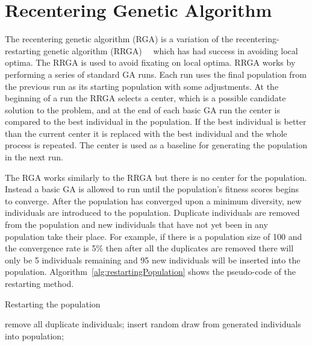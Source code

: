 \section{Recentering Genetic Algorithm}
\label{sec:rga}

The recentering genetic algorithm (RGA) is a variation of the recentering-restarting genetic algorithm (RRGA)~\cite{hughes2013recentering}~\cite{hughes2013edit} which has had success in avoiding local optima. The RRGA is used to avoid fixating on local optima. RRGA works by performing a series of standard GA runs. Each run uses the final population from the previous run as its starting population with some adjustments. At the beginning of a run the RRGA selects a center, which is a possible candidate solution to the problem, and at the end of each basic GA run the center is compared to the best individual in the population. If the best individual is better than the current center it is replaced with the best individual and the whole process is repeated. The center is used as a baseline for generating the population in the next run.

The RGA works similarly to the RRGA but there is no center for the population. Instead a basic GA is allowed to run until the population's fitness scores begins to converge. After the population has converged upon a minimum diversity, new individuals are introduced to the population. Duplicate individuals are removed from the population and new individuals that have not yet been in any population take their place. For example, if there is a population size of 100 and the convergence rate is 5\% then after all the duplicates are removed there will only be 5 individuals remaining and 95 new individuals will be inserted into the population. Algorithm~\ref{alg:restartingPopulation} shows the pseudo-code of the restarting method.

\begin{algorithm}[H]
\caption{Restarting the population}
\label{alg:restartingPopulation}
\begin{algorithmic}

  \STATE remove all duplicate individuals;
    \STATE insert random draw from generated individuals into population;
  \ENDWHILE
\ENDIF

\end{algorithmic}
\end{algorithm}